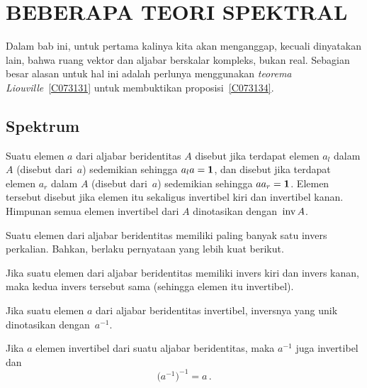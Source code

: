 \chapter{BEBERAPA TEORI SPEKTRAL}\label{spectrum}

Dalam bab ini, untuk pertama kalinya kita akan menganggap, kecuali dinyatakan lain, bahwa ruang
vektor dan aljabar berskalar kompleks, bukan real. Sebagian besar alasan untuk hal ini
adalah perlunya menggunakan \emph{teorema Liouville}~\ref{C073131} untuk membuktikan
proposisi~\ref{C073134}.

\section{Spektrum}

\begin{defn} Suatu elemen $a$ dari aljabar beridentitas $A$ disebut
 jika terdapat elemen $a_l$ dalam $A$ (disebut 
dari~$a$) sedemikian sehingga $a_l a = \mathbf{1}$, dan disebut
 jika terdapat elemen $a_r$ dalam $A$ (disebut  dari~$a$) sedemikian sehingga $aa_r = \mathbf{1}$. Elemen tersebut disebut
 jika elemen itu sekaligus invertibel kiri dan invertibel kanan. Himpunan semua
elemen invertibel dari $A$ dinotasikan
dengan~$\operatorname{inv} A$.
\end{defn}

Suatu elemen dari aljabar beridentitas memiliki paling banyak satu invers perkalian. Bahkan,
berlaku pernyataan yang lebih kuat berikut.

\begin{prop}\label{000521} Jika suatu elemen dari aljabar beridentitas memiliki invers kiri dan
invers kanan, maka kedua invers tersebut sama (sehingga elemen itu invertibel).
\end{prop}

Jika suatu elemen $a$ dari aljabar beridentitas invertibel, inversnya yang unik dinotasikan
dengan~$a^{-1}$.

\begin{prop} Jika $a$ elemen invertibel dari suatu aljabar beridentitas, maka $a^{-1}$ juga
invertibel dan
   \[ \bigl(a^{-1}\bigr)^{-1} = a\,. \]
\end{prop}

